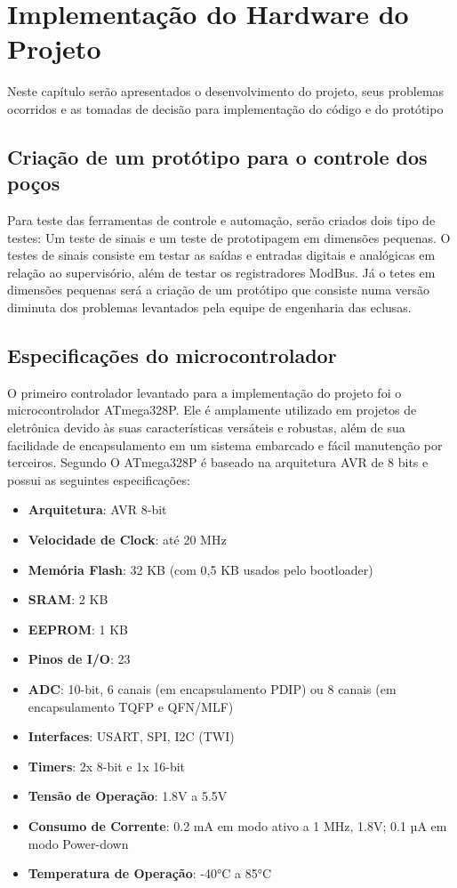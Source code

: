 \chapter[Implementação do Hardware do Projeto]{Implementação do Hardware do Projeto}

Neste capítulo serão apresentados o desenvolvimento do projeto, seus problemas ocorridos e as tomadas de decisão para implementação do código e do protótipo

\section{Criação de um protótipo para o controle dos poços}

Para teste das ferramentas de controle e automação, serão criados dois tipo de testes: Um teste de sinais e um teste de prototipagem em dimensões pequenas. 
O testes de sinais consiste em testar as saídas e entradas digitais e analógicas em relação ao supervisório, além de testar os registradores ModBus.
Já o tetes em dimensões pequenas será a criação de um protótipo que consiste numa versão diminuta dos problemas levantados pela equipe de engenharia das eclusas.

\section{Especificações do microcontrolador}

O primeiro controlador levantado para a implementação do projeto foi o microcontrolador ATmega328P. Ele é amplamente utilizado em projetos de eletrônica devido às suas características versáteis e robustas, além de sua facilidade de encapsulamento em um sistema embarcado e fácil manutenção por terceiros. Segundo \cite{atmega328p_datasheet} O ATmega328P é baseado na arquitetura AVR de 8 bits e possui as seguintes especificações:

\begin{itemize}
    \item \textbf{Arquitetura}: AVR 8-bit
    \item \textbf{Velocidade de Clock}: até 20 MHz
    \item \textbf{Memória Flash}: 32 KB (com 0,5 KB usados pelo bootloader)
    \item \textbf{SRAM}: 2 KB
    \item \textbf{EEPROM}: 1 KB
    \item \textbf{Pinos de I/O}: 23
    \item \textbf{ADC}: 10-bit, 6 canais (em encapsulamento PDIP) ou 8 canais (em encapsulamento TQFP e QFN/MLF)
    \item \textbf{Interfaces}: USART, SPI, I2C (TWI)
    \item \textbf{Timers}: 2x 8-bit e 1x 16-bit
    \item \textbf{Tensão de Operação}: 1.8V a 5.5V
    \item \textbf{Consumo de Corrente}: 0.2 mA em modo ativo a 1 MHz, 1.8V; 0.1 µA em modo Power-down
    \item \textbf{Temperatura de Operação}: -40°C a 85°C
\end{itemize}

